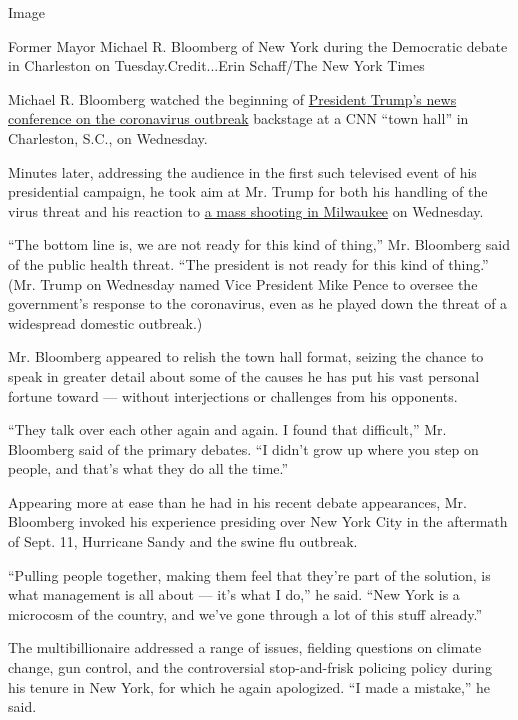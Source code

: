Image

Former Mayor Michael R. Bloomberg of New York during the Democratic
debate in Charleston on Tuesday.Credit...Erin Schaff/The New York Times

Michael R. Bloomberg watched the beginning of
\href{https://www.nytimes3xbfgragh.onion/2020/02/26/us/politics/trump-coronavirus-cdc.html}{President
Trump's news conference on the coronavirus outbreak} backstage at a CNN
``town hall'' in Charleston, S.C., on Wednesday.

Minutes later, addressing the audience in the first such televised event
of his presidential campaign, he took aim at Mr. Trump for both his
handling of the virus threat and his reaction to
\href{https://www.nytimes3xbfgragh.onion/2020/02/26/us/milwaukee-shooting-miller-coors.html}{a
mass shooting in Milwaukee} on Wednesday.

``The bottom line is, we are not ready for this kind of thing,'' Mr.
Bloomberg said of the public health threat. ``The president is not ready
for this kind of thing.'' (Mr. Trump on Wednesday named Vice President
Mike Pence to oversee the government's response to the coronavirus, even
as he played down the threat of a widespread domestic outbreak.)

Mr. Bloomberg appeared to relish the town hall format, seizing the
chance to speak in greater detail about some of the causes he has put
his vast personal fortune toward --- without interjections or challenges
from his opponents.

``They talk over each other again and again. I found that difficult,''
Mr. Bloomberg said of the primary debates. ``I didn't grow up where you
step on people, and that's what they do all the time.''

Appearing more at ease than he had in his recent debate appearances, Mr.
Bloomberg invoked his experience presiding over New York City in the
aftermath of Sept. 11, Hurricane Sandy and the swine flu outbreak.

``Pulling people together, making them feel that they're part of the
solution, is what management is all about --- it's what I do,'' he said.
``New York is a microcosm of the country, and we've gone through a lot
of this stuff already.''

The multibillionaire addressed a range of issues, fielding questions on
climate change, gun control, and the controversial stop-and-frisk
policing policy during his tenure in New York, for which he again
apologized. ``I made a mistake,'' he said.

